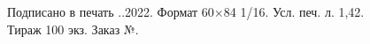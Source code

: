 
\thispagestyle{empty}

\vspace*{\fill}

\centering
Подписано в печать
\underline{\hspace{1em}}.\underline{\hspace{1em}}.2022.
Формат 60×84 1/16.
Усл. печ. л. 1,42.
\\
Тираж 100 экз. Заказ №\underline{\hspace{5em}}.

\vspace*{5em}

